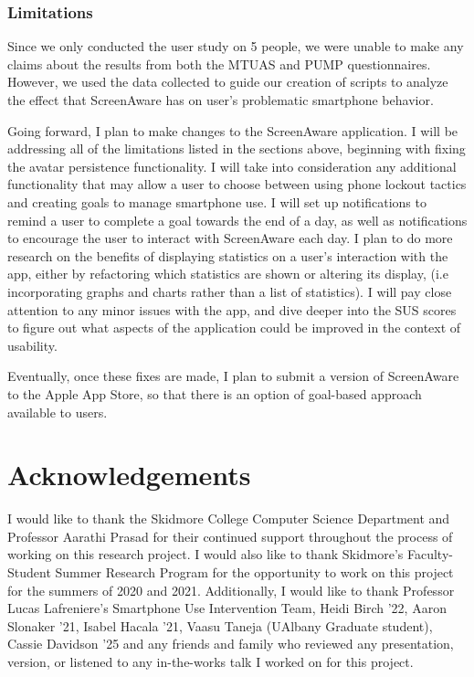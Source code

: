 \documentclass[12pt, title page, manuscript, nonacm]{acmart}
\begin{document}
\subsubsection*{Limitations}
Since we only conducted the user study on 5 people, we were unable to make any claims about the results from both the MTUAS and PUMP questionnaires. However, we used the data collected to guide our creation of scripts to analyze the effect that ScreenAware has on user's problematic smartphone behavior. 
\par
Going forward, I plan to make changes to the ScreenAware application. I will be addressing all of the limitations listed in the sections above, beginning with fixing the avatar persistence functionality. I will take into consideration any additional functionality that may allow a user to choose between using phone lockout tactics and creating goals to manage smartphone use. I will set up notifications to remind a user to complete a goal towards the end of a day, as well as notifications to encourage the user to interact with ScreenAware each day. I plan to do more research on the benefits of displaying statistics on a user's interaction with the app, either by refactoring which statistics are shown or altering its display, (i.e incorporating graphs and charts rather than a list of statistics). I will pay close attention to any minor issues with the app, and dive deeper into the SUS scores to figure out what aspects of the application could be improved in the context of usability.
\par Eventually, once these fixes are made, I plan to submit a version of ScreenAware to the Apple App Store, so that there is an option of goal-based approach available to users.


\section*{Acknowledgements}
I would like to thank the Skidmore College Computer Science Department and Professor Aarathi Prasad for their continued support throughout the process of working on this research project. I would also like to thank Skidmore's Faculty-Student Summer Research Program for the opportunity to work on this project for the summers of 2020 and 2021. Additionally, I would like to thank Professor Lucas Lafreniere's Smartphone Use Intervention Team, Heidi Birch '22, Aaron Slonaker '21, Isabel Hacala '21, Vaasu Taneja (UAlbany Graduate student), Cassie Davidson '25 and any friends and family who reviewed any presentation, version, or listened to any in-the-works talk I worked on for this project. 
\newpage
\end{document}
